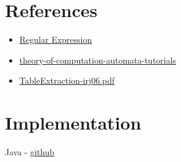 \documentclass{article}
\begin{document}
\section{References}
\begin{itemize}
    \item \hyperlink{https://en.wikipedia.org/wiki/Regular_expression}{Regular Expression}
    \item \hyperlink{https://www.geeksforgeeks.org/theory-of-computation-automata-tutorials/?ref=lbp}{theory-of-computation-automata-tutorials}
    \item \hyperlink{https://people.cs.umass.edu/~mccallum/papers/TableExtraction-irj06.pdf}{TableExtraction-irj06.pdf}
\end{itemize}

\section{Implementation}

Java - \hyperlink{https://github.com/RomualdRousseau/Archery}{github}
\end{document}
